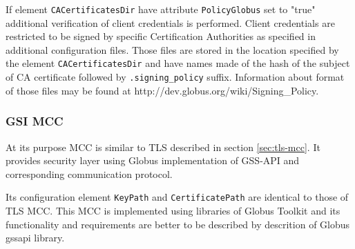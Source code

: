 \documentclass{article}
\makeatletter
\renewcommand\paragraph{\@startsection{paragraph}{4}{\z@}%
  {-3.25ex\@plus -1ex \@minus -.2ex}%
  {1.5ex \@plus .2ex}%
  {\normalfont\normalsize\bfseries}}
\makeatother
\begin{document}
If element \texttt{CACertificatesDir} have attribute \texttt{PolicyGlobus} set
to "true" additional verification of client credentials is performed. Client
credentials are restricted to be signed by specific Certification Authorities
as specified in additional configuration files. Those files are stored in the
location specified by the element \texttt{CACertificatesDir} and have names
made of the hash of the subject of CA certificate followed by \texttt{.signing\_policy}
suffix. Information about format of those files may be found at
http://dev.globus.org/wiki/Signing\_Policy.

\subsubsection{GSI MCC}\label{sec:gsi-mcc}
At its purpose MCC is similar to TLS described in section \ref{sec:tls-mcc}. It
provides security layer using Globus implementation of GSS-API and corresponding
communication protocol.

Its configuration element \texttt{KeyPath} and \texttt{CertificatePath} are
identical to those of TLS MCC. This MCC is implemented using libraries of
Globus Toolkit and its functionality and requirements are better to be
described by descrition of Globus gssapi library.
\end{document}
